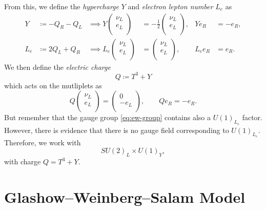 From this, we define the \emph{hypercharge} $Y$ and \emph{electron lepton number} $L_e$ as
\begin{align}
  Y &\coloneqq -Q_R - Q_L & \implies Y 
  \begin{pmatrix}
    \nu_L \\
    e_L \\
  \end{pmatrix}
  &= -\frac{1}{2}
  \begin{pmatrix}
  \nu_L \\
  e_L \\
  \end{pmatrix}
  , & 
  Y e_R &= -e_R, \\
  L_e &\coloneqq 2 Q_L + Q_R & \implies L_e 
  \begin{pmatrix}
    \nu_L \\
    e_L \\
  \end{pmatrix}
  &=
  \begin{pmatrix}
  \nu_L \\
  e_L \\
  \end{pmatrix}
  , & 
  L_e e_R &= e_R.
\end{align}
We then define the \emph{electric charge}
\begin{equation}
  \boxed{Q \coloneqq T^3 + Y}
\end{equation}
which acts on the mutliplets as
\begin{equation}
  Q 
  \begin{pmatrix}
  \nu_L \\
  e_L \\
  \end{pmatrix}
  = 
  \begin{pmatrix}
  0 \\
  -e_L \\
  \end{pmatrix}
  ,\qquad Q e_R = -e_R.
\end{equation}
But remember that the gauge group \eqref{eq:ew-group} contains also a $U(1)_{L_e}$ factor.
However, there is evidence that there is no gauge field corresponding to $U(1)_{L_e}$.
Therefore, we work with
\begin{equation}
  SU(2)_L \times U(1)_Y,
\end{equation}
with charge $Q = T^3 + Y$.

\section{Glashow--Weinberg--Salam Model}%
\label{sec:glashow_weinberg_salam_model}

